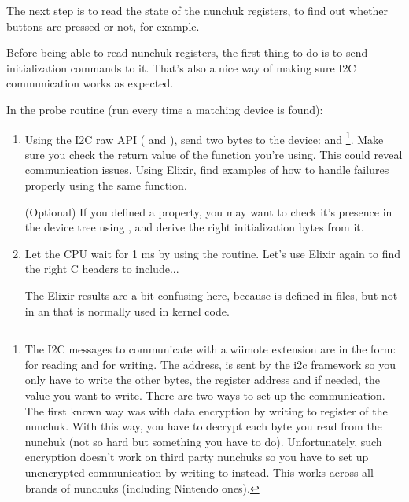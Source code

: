 The next step is to read the state of the nunchuk registers, to find out
whether buttons are pressed or not, for example.

Before being able to read nunchuk registers, the first thing to do is
to send initialization commands to it. That's also a nice way of making
sure I2C communication works as expected.

In the probe routine (run every time a matching device is found):

\begin{enumerate}
\item Using the I2C raw API ( and
        ), send two bytes to the
        device:  and \footnote{
	The I2C messages to communicate with a wiimote
        extension are in the form: 
        for reading and  for
        writing. The address,  is sent by the i2c framework
        so you only have to write the other bytes, the register
        address and if needed, the value you want to write. There are
        two ways to set up the communication. The first known way was
        with data encryption by writing  to register
         of the nunchuk.  With this way, you have to
        decrypt each byte you read from the nunchuk (not so hard but
        something you have to do).  Unfortunately, such encryption
        doesn't work on third party nunchuks so you have to set up
        unencrypted communication by writing  to
         instead. This works across all brands of nunchuks
        (including Nintendo ones).}.
      Make sure you check the return value of the function you're
      using. This could reveal communication issues.  Using Elixir, find
      examples of how to handle failures properly using the same
      function.

      (Optional) If you defined a 
      property, you may want to check it's presence in the device tree
      using , and derive the right
      initialization bytes from it.

\item Let the CPU wait for 1 ms by using the  routine.
      Let's use Elixir again to find the right C headers to include...

      The Elixir results are a bit confusing here, because
       is defined in  files,
      but not in an  that is normally used
      in kernel code.


\end{enumerate}
